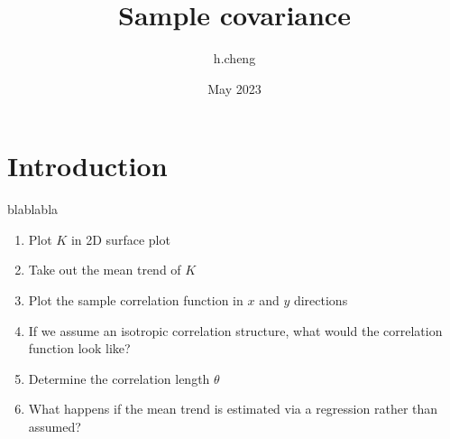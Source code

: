 \documentclass{article}
\title{Sample covariance}
\author{h.cheng }
\date{May 2023}
\begin{document}
\maketitle

\section{Introduction}

blablabla
\begin{enumerate}
    \item Plot $ K $ in 2D surface plot
    \item Take out the mean trend of $ K $
    \item Plot the sample correlation function in $ x $ and $ y $ directions
    \item If we assume an isotropic correlation structure, what would the correlation function look like?
    \item Determine the correlation length $\theta$
    \item What happens if the mean trend is estimated via a regression rather than assumed?
\end{enumerate}
\end{document}
